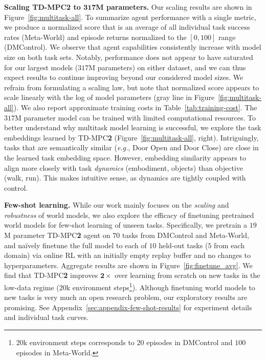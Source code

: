 \documentclass{article}
\begin{document}
\textbf{Scaling TD-MPC\textcolor{nhred}{2} to $\mathbf{317}$M parameters.} Our scaling results are shown in Figure~\ref{fig:multitask-all}. To summarize agent performance with a single metric, we produce a normalized score that is an average of all individual task success rates (Meta-World) and episode returns normalized to the $[0, 100]$ range (DMControl). We observe that agent capabilities consistently increase with model size on both task sets. Notably, performance does not appear to have saturated for our largest models ($317$M parameters) on either dataset, and we can thus expect results to continue improving beyond our considered model sizes. We refrain from formulating a scaling law, but note that normalized score appears to scale linearly with the log of model parameters (gray line in Figure~\ref{fig:multitask-all}). We also report approximate training costs in Table~\ref{tab:training-cost}. The $317$M parameter model can be trained with limited computational resources. To better understand why multitask model learning is successful, we explore the task embeddings learned by TD-MPC\textbf{2} (Figure~\ref{fig:multitask-all}, right). Intriguingly, tasks that are semantically similar (\emph{e.g.}, Door Open and Door Close) are close in the learned task embedding space. However, embedding similarity appears to align more closely with task \emph{dynamics} (embodiment, objects) than objective (walk, run). This makes intuitive sense, as dynamics are tightly coupled with control.

\textbf{Few-shot learning.} While our work mainly focuses on the \emph{scaling} and \emph{robustness} of world models, we also explore the efficacy of finetuning pretrained world models for few-shot learning of unseen tasks. Specifically, we pretrain a $19$M parameter TD-MPC\textbf{2} agent on $70$ tasks from DMControl and Meta-World, and naïvely finetune the full model to each of $10$ held-out tasks ($5$ from each domain) via online RL with an initially empty replay buffer and no changes to hyperparameters. Aggregate results are shown in Figure~\ref{fig:finetune_avg}. We find that TD-MPC\textbf{2} improves $\mathbf{2\times}$ over learning from scratch on new tasks in the low-data regime ($20$k environment steps\footnote{$20$k environment steps corresponds to $20$ episodes in DMControl and $100$ episodes in Meta-World.}). Although finetuning world models to new tasks is very much an open research problem, our exploratory results are promising. See Appendix~\ref{sec:appendix-few-shot-results} for experiment details and individual task curves.
\end{document}
